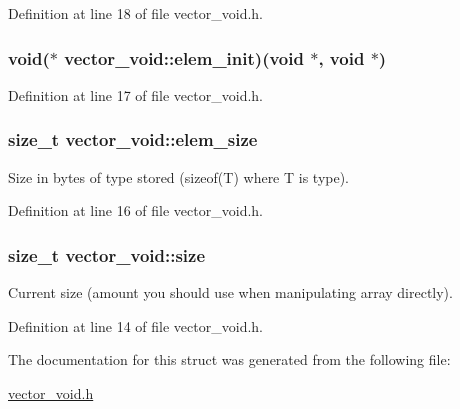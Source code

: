 Definition at line 18 of file vector\-\_\-void.\-h.

\hypertarget{structvector__void_af5d27d7e1af89d5dfbcf49f1810cc0c2}{
\subsubsection[{elem\-\_\-init}]{\setlength{\rightskip}{0pt plus 5cm}void($\ast$ vector\-\_\-void\-::elem\-\_\-init)(void $\ast$, void $\ast$)}}\label{structvector__void_af5d27d7e1af89d5dfbcf49f1810cc0c2}


Definition at line 17 of file vector\-\_\-void.\-h.

\hypertarget{structvector__void_afedda26ce85492462b79dae9090c49f6}{
\subsubsection[{elem\-\_\-size}]{\setlength{\rightskip}{0pt plus 5cm}size\-\_\-t vector\-\_\-void\-::elem\-\_\-size}}\label{structvector__void_afedda26ce85492462b79dae9090c49f6}


Size in bytes of type stored (sizeof(\-T) where T is type). 



Definition at line 16 of file vector\-\_\-void.\-h.

\hypertarget{structvector__void_a94e09482f6122993461724a988ae6f92}{
\subsubsection[{size}]{\setlength{\rightskip}{0pt plus 5cm}size\-\_\-t vector\-\_\-void\-::size}}\label{structvector__void_a94e09482f6122993461724a988ae6f92}


Current size (amount you should use when manipulating array directly). 



Definition at line 14 of file vector\-\_\-void.\-h.



The documentation for this struct was generated from the following file\-:\begin{DoxyCompactItemize}
\item 
\hyperlink{vector__void_8h}{vector\-\_\-void.\-h}\end{DoxyCompactItemize}

